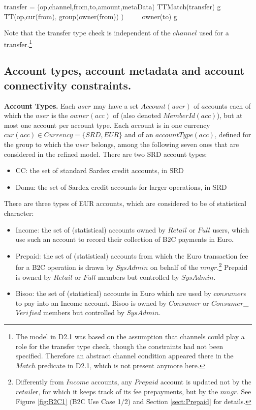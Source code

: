 \begin{asm}
\LET transfer = (op,channel,from,to,amount,metaData) \+
TTMatch(transfer) \IFF \+
\FORSOME g   \in	TT(op,cur(from), group(owner(from)) ) ~~~~  
    owner(to) \in g
\end{asm}

Note that the transfer type check is independent of the $channel$ used for a transfer.\footnote{The model in D2.1 was based on the assumption that channels could play a role for the transfer type check, though the constraints had not been specified. Therefore an abstract channel condition appeared there in the $Match$ predicate in D2.1, which is not present anymore here.}



\subsection{Account types, account metadata and account connectivity constraints.}
\label{sect:accounts}

{\bf Account Types.} Each $user$ may have a set $Account(user)$ of $acc$ounts each of which the $user$ is the  $owner(acc)$ of (also denoted $MemberId(acc)$), but at most one account per account type. Each $acc$ount is in one currency $cur(acc) \in Currency=\{SRD,EUR\}$ and of an $accountType(acc)$, defined for the group to which the $user$ belongs, among the following seven ones that are considered in the refined model. There are two SRD account types:
\begin{itemize}
	\item CC: the set of standard Sardex credit accounts, in SRD
	\item Domu:  the set of Sardex credit accounts for larger operations, in SRD
\end{itemize}

There are three types of EUR accounts, which are considered to be of statistical character:
\begin{itemize}
	\item  Income: the set of (statistical) accounts owned by $Retail$ or $Full$ users, which use such an account to record their collection of B2C payments in Euro.
	\item Prepaid: the set of (statistical) accounts from which the Euro transaction fee for a B2C operation is drawn by $SysAdmin$ on behalf of the $mngr$.\footnote{Differently from $Income$ accounts, any $Prepaid$ account is updated not by the $retail$er, for which it keeps track of its fee prepayments, but by the $mngr$. See Figure \ref{fig:B2C1} (B2C Use Case 1/2) and Section \ref{sect:Prepaid} for details.} Prepaid is owned by $Retail$ or $Full$ members but controlled by $SysAdmin$.	
	\item Bisoo: the set of (statistical) accounts in Euro which are used by $consumer$s to pay into an Income account. Bisoo is owned by $Consumer$ or $Consumer$\_$Verified$ members but controlled by $SysAdmin$.
\end{itemize}

